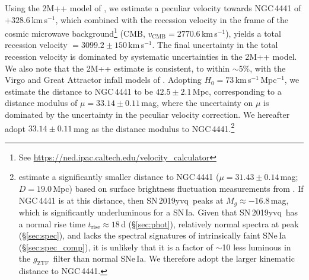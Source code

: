 \documentclass[twocolumn]{aastex63}
\newcommand{\fromkate}[1]{{\color{brown} fromKM: {#1}}}
\newcommand{\todo}[1]{{\color{magenta} to-do: {#1}}}
\newcommand{\gztf}{$g_\mathrm{ZTF}$}
\newcommand{\kms}{km\,s$^{-1}$}
\newcommand{\sn}{SN\,2019yvq}
\begin{document}
Using the 2M++ model of \citet{Carrick15}, we estimate a peculiar velocity
towards NGC\,4441 of $+328.6$\,\kms, which combined with the recession
velocity in the frame of the cosmic microwave background\footnote{See
\url{https://ned.ipac.caltech.edu/velocity_calculator}} (CMB, $v_\mathrm{CMB}
= 2770.6$\,\kms), yields a total recession velocity $= 3099.2 \pm 150$\,\kms.
The final uncertainty in the total recession velocity is dominated by
systematic uncertainties in the 2M++ model. We also note that the 2M++
estimate is consistent, to within $\sim$5\%, with the Virgo and Great
Attractor infall models of \citet{Mould00}. Adopting $H_0 =
73$\,\kms\,Mpc$^{-1}$, we estimate the distance to NGC\,4441 to be $42.5 \pm
2.1$\,Mpc, corresponding to a distance modulus of $\mu = 33.14 \pm 0.11$\,mag,
where the uncertainty on $\mu$ is dominated by the uncertainty in the peculiar
velocity correction. We hereafter adopt $33.14 \pm 0.11$\,mag as the distance
modulus to NGC\,4441.\footnote{\citet{Tully13} estimate a significantly
smaller distance to NGC\,4441 ($\mu = 31.43 \pm 0.14$\,mag; $D = 19.0$\,Mpc)
based on surface brightness fluctuation measurements from \citet{Tonry01}. If
NGC\,4441 is at this distance, then \sn\ peaks at $M_g \approx -16.8$\,mag,
which is significantly underluminous for a SN\,Ia. Given that \sn\ has a
normal rise time $t_\mathrm{rise} \approx 18$\,d (\S\ref{sec:phot}),
relatively normal spectra at peak (\S\ref{sec:spec}), and lacks the spectral
signatures of intrinsically faint SNe\,Ia (\S\ref{sec:spec_comp}), it is
unlikely that it is a factor of $\sim$10 less luminous in the \gztf\ filter
than normal SNe\,Ia. We therefore adopt the larger kinematic distance to
NGC\,4441.}
\end{document}
